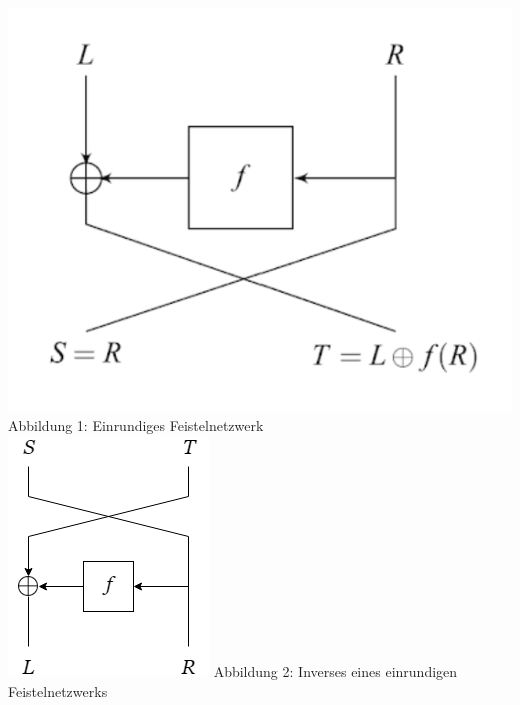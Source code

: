 \documentclass[course=erap]{aspdoc}
\begin{document}
\begin{multicols}{2}
{
\begin{center}
    \includegraphics[scale=1]{img/1_round_feistel_cipher_enc.png}\break
    Abbildung 1: Einrundiges Feistelnetzwerk \cite[Fig. 2.1]{nachef}\\
    \vspace{5mm}
    \includegraphics[scale=0.4]{img/1_round_feistel_cipher_dec.png}\break
    Abbildung 2: Inverses eines einrundigen Feistelnetzwerks\bigbreak
\end{center}
}
{
\begin{center}

\end{center}}
\end{multicols}
\end{document}
